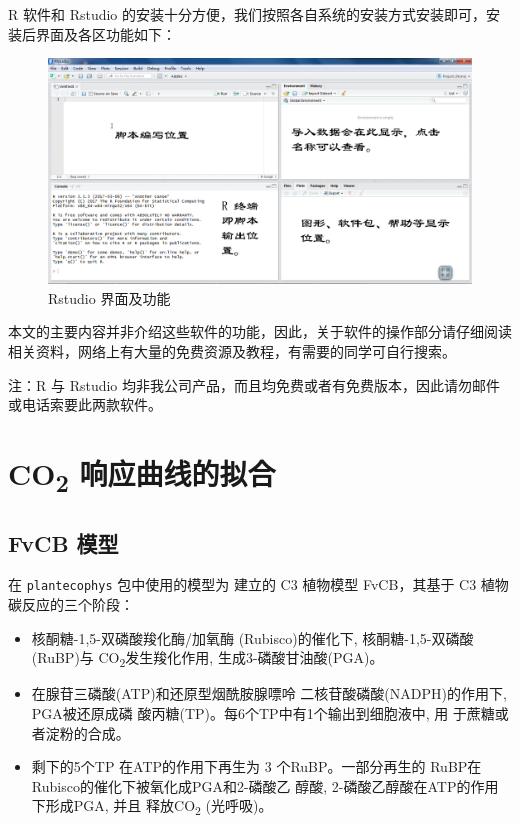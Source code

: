 \documentclass[]{krantz}
\renewenvironment{quote}{\begin{VF}}{\end{VF}}
\theoremstyle{definition}
\theoremstyle{definition}
\theoremstyle{definition}
\theoremstyle{remark}
\begin{document}
R 软件和 Rstudio
的安装十分方便，我们按照各自系统的安装方式安装即可，安装后界面及各区功能如下：

\begin{figure}
\includegraphics[width=4.55in]{images/rstudio} \caption{Rstudio 界面及功能}\label{fig:unnamed-chunk-1}
\end{figure}

本文的主要内容并非介绍这些软件的功能，因此，关于软件的操作部分请仔细阅读相关资料，网络上有大量的免费资源及教程，有需要的同学可自行搜索。

\begin{quote}
注：R 与 Rstudio
均非我公司产品，而且均免费或者有免费版本，因此请勿邮件或电话索要此两款软件。
\end{quote}

\cleardoublepage

\chapter{\texorpdfstring{CO\textsubscript{2}
响应曲线的拟合}{CO2 响应曲线的拟合}}\label{co2-}

\section{FvCB 模型}\label{fvcb-}

在 \texttt{plantecophys} 包中使用的模型为 \citet{Farquhar1980A} 建立的
C3 植物模型 FvCB，其基于 C3 植物碳反应的三个阶段：

\begin{itemize}
\item
  核酮糖-1,5-双磷酸羧化酶/加氧酶 (Rubisco)的催化下,
  核酮糖-1,5-双磷酸(RuBP)与 CO\textsubscript{2}发生羧化作用,
  生成3-磷酸甘油酸(PGA)。
\item
  在腺苷三磷酸(ATP)和还原型烟酰胺腺嘌呤 二核苷酸磷酸(NADPH)的作用下,
  PGA被还原成磷 酸丙糖(TP)。每6个TP中有1个输出到细胞液中, 用
  于蔗糖或者淀粉的合成。
\item
  剩下的5个TP 在ATP的作用下再生为 3 个RuBP。一部分再生的
  RuBP在Rubisco的催化下被氧化成PGA和2-磷酸乙 醇酸,
  2-磷酸乙醇酸在ATP的作用下形成PGA, 并且 释放CO\textsubscript{2}
  (光呼吸)。
\end{itemize}
\end{document}
